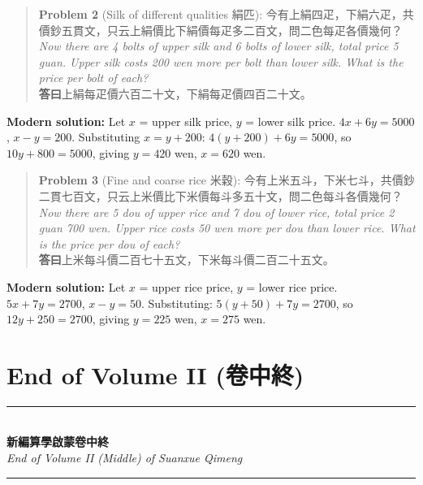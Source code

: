 \documentclass[11pt,a4paper]{article}
\newcommand{\longline}{\noindent\rule{\textwidth}{0.4pt}}
\newenvironment{problembox}{%
  \begin{quote}
  \itshape
  \color{problemcolor}
}{%
  \end{quote}
}
\begin{document}
\vspace{0.3cm}

\begin{problembox}
\textbf{Problem 2} (Silk of different qualities 絹匹): 今有上絹四疋，下絹六疋，共價鈔五貫文，只云上絹價比下絹價每疋多二百文，問二色每疋各價幾何？\\[0.2cm]
\textit{Now there are 4 bolts of upper silk and 6 bolts of lower silk, total price 5 guan. Upper silk costs 200 wen more per bolt than lower silk. What is the price per bolt of each?}\\[0.2cm]
\textbf{答曰}上絹每疋價六百二十文，下絹每疋價四百二十文。
\end{problembox}

\textbf{Modern solution:} Let $x$ = upper silk price, $y$ = lower silk price. $4x + 6y = 5000$, $x - y = 200$. Substituting $x = y + 200$: $4(y+200) + 6y = 5000$, so $10y + 800 = 5000$, giving $y = 420$ wen, $x = 620$ wen.

\vspace{0.3cm}

\begin{problembox}
\textbf{Problem 3} (Fine and coarse rice 米穀): 今有上米五斗，下米七斗，共價鈔二貫七百文，只云上米價比下米價每斗多五十文，問二色每斗各價幾何？\\[0.2cm]
\textit{Now there are 5 dou of upper rice and 7 dou of lower rice, total price 2 guan 700 wen. Upper rice costs 50 wen more per dou than lower rice. What is the price per dou of each?}\\[0.2cm]
\textbf{答曰}上米每斗價二百七十五文，下米每斗價二百二十五文。
\end{problembox}

\textbf{Modern solution:} Let $x$ = upper rice price, $y$ = lower rice price. $5x + 7y = 2700$, $x - y = 50$. Substituting: $5(y+50) + 7y = 2700$, so $12y + 250 = 2700$, giving $y = 225$ wen, $x = 275$ wen.

\newpage

\section{End of Volume II (卷中終)}

\begin{center}
\longline\\[0.5cm]
{\Large\bfseries 新編算學啟蒙卷中終}\\[0.3cm]
{\large\textit{End of Volume II (Middle) of Suanxue Qimeng}}\\[0.5cm]
\longline
\end{center}
\end{document}
